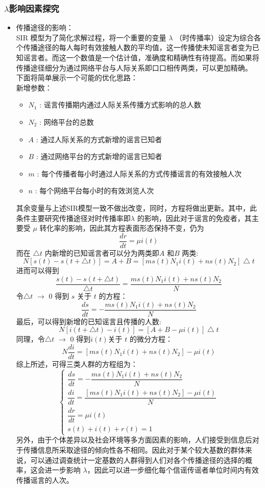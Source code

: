 \documentclass[withoutpreface,bwprint]{cumcmthesis}
\begin{document}
\subsubsection{$\lambda$影响因素探究}
\begin{itemize}
	\item 传播途径的影响：\\
	 SIR 模型为了简化求解过程，将一个重要的变量 $\lambda$ （时传播率）设定为综合各个传播途径的每人每时有效接触人数的平均值，这一传播使未知谣言者变为已知谣言者。而这一个数值是一个估计值，准确度和精确性有待提高。而如果将传播途径细分为通过网络平台与人际关系即口口相传两类，可以更加精确。\\
	下面将简单展示一个可能的优化思路：\\
	新增参数：
	\begin{itemize}
		\item $N_{1}$ : 谣言传播期内通过人际关系传播方式影响的总人数
		\item $N_{2}$ : 网络平台的总数
		\item $A$ : 通过人际关系的方式新增的谣言已知者
		\item $B$ : 通过网络平台的方式新增的谣言已知者
		\item $m$ : 每个传播者每小时通过人际关系的方式传播谣言的有效接触人次
		\item $n$ : 每个网络平台每小时的有效浏览人次
		
	\end{itemize}
	其余变量与上述SIR模型一致不做出改变，同时，方程将做出更新。其中，此条件主要研究传播途径对时传播率即$\lambda$ 的影响，因此对于谣言的免疫者，其主要受 $\mu$ 转化率的影响，因此其方程表面形态保持不变，仍为
	\[
	\frac{dr}{dt} = \mu i(t)
	\]
	而在 $\bigtriangleup t$ 内新增的已知谣言者可以分为两类即$A$ 和$B$ 两类:
	\[
	N[s(t)-s(t+\bigtriangleup t)] = A + B = [ms(t)N_{1}i(t) + ns(t)N_{2}]\bigtriangleup t
	\]
	进而可以得到
	\[
	\frac{s(t)-s(t+\bigtriangleup t)}{\bigtriangleup t} =\frac{ms(t)N_{1}i(t) + ns(t)N_{2}}{N}
	\]
	令$\bigtriangleup t$ $\longrightarrow$ 0 得到 $s$ 关于 $t$ 的方程：
	\[
	\frac{ds}{dt} = -\frac{ms(t)N_{1}i(t) + ns(t)N_{2}}{N}
	\]
	最后，可以得到新增的已知谣言且传播的人数:
	\[
	N[i(t+\bigtriangleup t)- i(t)] = [A+B - \mu i(t)]\bigtriangleup t
	\]
	同理，令$\bigtriangleup t$ $\longrightarrow$ 0 得到$i(t)$关于 $t$ 的微分方程：
	\[
	N\frac{di}{dt} = [ms(t)N_{1}i(t) + ns(t)N_{2}] - \mu i(t)
	\]
	综上所述，可得三类人群的方程组为：
	\begin{equation*}
		\begin{cases}
			\dfrac{ds}{dt} = -\dfrac{ms(t)N_{1}i(t) + ns(t)N_{2}}{N} \\
			\dfrac{di}{dt} = \dfrac{[ms(t)N_{1}i(t) + ns(t)N_{2}] - \mu i(t)}{N}\\
			\dfrac{dr}{dt} = \mu i(t)\\
			 s(t)+i(t)+r(t)=1
		\end{cases}
	\end{equation*}
	另外，由于个体差异以及社会环境等多方面因素的影响，人们接受到信息后对于传播信息所采取途径的倾向性各不相同。因此对于某个较大基数的群体来说，可以通过调查统计一定基数的人群得到人们对各个传播途径的选择的概率，这会进一步影响 $\lambda$，因此可以进一步细化每个信谣传谣者单位时间内有效传播谣言的人次。		
\end{itemize}
\end{document}
